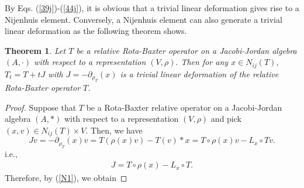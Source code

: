 \documentclass[12pt]{amsart}
\newtheorem{theorem}[Theorem]{Theorem}
\begin{document}
	By Eqs. (\ref{39j})-(\ref{44j}), it is obvious that a trivial linear deformation gives rise to a Nijenhuis
element. Conversely, a Nijenhuis element can also generate a trivial linear deformation as the
following theorem shows.
\begin{theorem}\label{thJP}
	Let $T$ be a relative Rota-Baxter operator on a Jacobi-Jordan algebra $(A,\cdot)$ with
	respect to a representation $(V,\rho).$ Then for any $x\in N_{ij}(T ),$ $T_t=T + tJ$ with 
	$J=-\partial_{\rho_{T}}(x)$	is a
	trivial linear deformation of the relative Rota-Baxter operator $T$.
\end{theorem}
\begin{proof}
Suppose that $ T $ be a Rota-Baxter relative operator on a Jacobi-Jordan algebra $ (A,\ast) $ with respect to a representation $ (V,\rho) $ and pick $ (x,v)\in N_{ij}(T)\times V $. Then, we have
$$ 
Jv=-\partial_{\rho_{T}}(x)v
=T(\rho(x)v)-T(v)\ast x
=T\circ\rho(x)v-L_{x}\circ Tv.
 $$
i.e.,
 \begin{eqnarray}
J=T\circ\rho(x)-L_{x}\circ T
\label{J1}.
\end{eqnarray} 
Therefore, by (\ref{N1}), we obtain


\end{proof}
\end{document}
